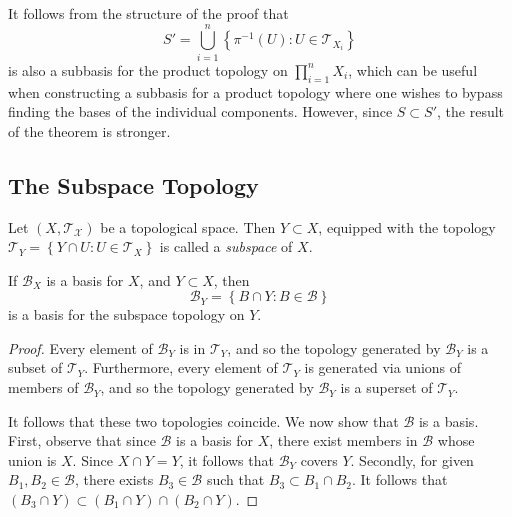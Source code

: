 \begin{remark}
	\label{rem:can-sub-open-sets}
	It follows from the structure of the proof that
	\begin{equation*}
		S' = \bigcup_{i=1}^{n} \left\{ \pi^{-1}(U): U \in \mathcal{T}_{X_{i}}  \right\}
	\end{equation*}
	is also a subbasis for the product topology on $\prod_{i=1}^{n} X_{i}$, which
	can be useful when constructing a subbasis for a product topology where
	one wishes to bypass finding the bases of the individual components.
	However, since $S \subset S'$, the result of the theorem is stronger.
\end{remark}
\subsection{The Subspace Topology}
\begin{definition}
	\label{def:subspace-top}
	Let $(X, \mathcal{T_{X}})$ be a topological space. Then $Y \subset X$,
	equipped with the topology $\mathcal{T}_{Y} = \left\{ Y \cap U: U \in
	\mathcal{T}_{X} \right\}$ is called a \emph{subspace} of $X$.
\end{definition}
\begin{lemma}
	\label{lem:basis-subspace}
	If $\mathcal{B}_{X}$ is a basis for $X$, and $Y \subset X$, then
	\begin{equation*}
		\mathcal{B}_{Y} = \left\{ B \cap Y: B \in \mathcal{B} \right\}
	\end{equation*}
	is a basis for the subspace topology on $Y$.
\end{lemma}
\begin{proof}
	Every element of $\mathcal{B}_{Y}$ is in $\mathcal{T}_{Y}$, and so
	the topology generated by $\mathcal{B}_{Y}$ is a subset of
	$\mathcal{T}_{Y}$. Furthermore, every element of $\mathcal{T}_{Y}$
	is generated via unions of members of $\mathcal{B}_{Y}$, and so
	the topology generated by $\mathcal{B}_{Y}$ is a superset of
	$\mathcal{T}_{Y}$.

	It follows that these two topologies coincide. We now show that $\mathcal{B}$
	is a basis. First, observe that since $\mathcal{B}$ is a
	basis for $X$, there exist members in $\mathcal{B}$ whose union is $X$. Since
	$X \cap Y = Y$, it follows that $\mathcal{B}_{Y}$ covers $Y$. Secondly,
	for given $B_{1}, B_{2} \in \mathcal{B}$, there exists $B_{3} \in \mathcal{B}$
	such that $B_{3} \subset B_{1} \cap B_{2}$. It follows that
	$\left( B_{3} \cap Y  \right)\subset (B_{1} \cap Y) \cap (B_{2} \cap Y)$.
\end{proof}
